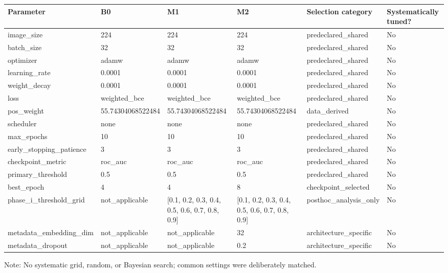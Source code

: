 \begin{table}[t]
\centering
\small
\begin{tabular}{llllll}
\toprule
Parameter & B0 & M1 & M2 & Selection category & Systematically tuned? \\
\midrule
image\_size & 224 & 224 & 224 & predeclared\_shared & No \\
batch\_size & 32 & 32 & 32 & predeclared\_shared & No \\
optimizer & adamw & adamw & adamw & predeclared\_shared & No \\
learning\_rate & 0.0001 & 0.0001 & 0.0001 & predeclared\_shared & No \\
weight\_decay & 0.0001 & 0.0001 & 0.0001 & predeclared\_shared & No \\
loss & weighted\_bce & weighted\_bce & weighted\_bce & predeclared\_shared & No \\
pos\_weight & 55.74304068522484 & 55.74304068522484 & 55.74304068522484 & data\_derived & No \\
scheduler & none & none & none & predeclared\_shared & No \\
max\_epochs & 10 & 10 & 10 & predeclared\_shared & No \\
early\_stopping\_patience & 3 & 3 & 3 & predeclared\_shared & No \\
checkpoint\_metric & roc\_auc & roc\_auc & roc\_auc & predeclared\_shared & No \\
primary\_threshold & 0.5 & 0.5 & 0.5 & predeclared\_shared & No \\
best\_epoch & 4 & 4 & 8 & checkpoint\_selected & No \\
phase\_i\_threshold\_grid & not\_applicable & [0.1, 0.2, 0.3, 0.4, 0.5, 0.6, 0.7, 0.8, 0.9] & [0.1, 0.2, 0.3, 0.4, 0.5, 0.6, 0.7, 0.8, 0.9] & posthoc\_analysis\_only & No \\
metadata\_embedding\_dim & not\_applicable & not\_applicable & 32 & architecture\_specific & No \\
metadata\_dropout & not\_applicable & not\_applicable & 0.2 & architecture\_specific & No \\
\bottomrule
\end{tabular}
\vspace{2pt}
\parbox{0.98\textwidth}{\footnotesize Note: No systematic grid, random, or Bayesian search; common settings were deliberately matched.}
\end{table}
